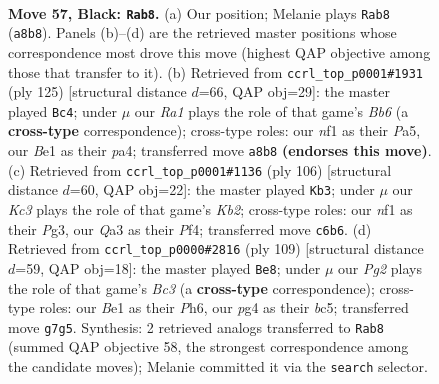 \documentclass[11pt]{article}
\begin{document}
\clearpage

\begin{figure}[p]\centering
\begin{subfigure}{0.46\textwidth}\centering
\resizebox{\linewidth}{!}{%
\newchessgame
\chessboard[
  setfen={r5r1/p5pQ/2k4p/3p3P/p2P2P1/q3P3/7K/4bN2 b - - 23 57},
  showmover=false,
  pgfstyle=straightmove, color=movearrow, markmove={a8-b8}
]}
\caption{}
\end{subfigure}\hfill
\begin{subfigure}{0.46\textwidth}\centering
\resizebox{\linewidth}{!}{%
\newchessgame
\chessboard[
  setfen={8/kr3p2/2Q1p1p1/p2pP3/P4P2/1b2P1K1/8/8 b - - 0 63},
  showmover=false,
  pgfstyle=straightmove, color=movearrow, markmove={b3-c4}
]}
\caption{}
\end{subfigure}
\\[4pt]
\begin{subfigure}{0.46\textwidth}\centering
\resizebox{\linewidth}{!}{%
\newchessgame
\chessboard[
  setfen={8/p4p1k/6p1/q1P4p/5P2/P1R1R1P1/1KP1p3/8 w - - 16 54},
  showmover=false,
  pgfstyle=straightmove, color=movearrow, markmove={b2-b3}
]}
\caption{}
\end{subfigure}\hfill
\begin{subfigure}{0.46\textwidth}\centering
\resizebox{\linewidth}{!}{%
\newchessgame
\chessboard[
  setfen={2rr4/6pk/Q1bP1p1p/2B1pP1P/6P1/6K1/1P6/8 b - - 8 55},
  showmover=false,
  pgfstyle=straightmove, color=movearrow, markmove={c6-e8}
]}
\caption{}
\end{subfigure}
\caption{\textbf{Move 57, Black: \texttt{Rab8}.} (a) Our position; Melanie plays \texttt{Rab8} (\texttt{a8b8}). Panels (b)--(d) are the retrieved master positions whose correspondence most drove this move (highest QAP objective among those that transfer to it). (b) Retrieved from \texttt{ccrl\_top\_p0001\#1931} (ply 125) [structural distance $d$=66, QAP obj=29]: the master played \texttt{Bc4}; under $\mu$ our \emph{Ra1} plays the role of that game's \emph{Bb6} (a \textbf{cross-type} correspondence); cross-type roles: our \emph{n}f1 as their \emph{P}a5, our \emph{B}e1 as their \emph{p}a4; transferred move \texttt{a8b8} \textbf{(endorses this move)}. (c) Retrieved from \texttt{ccrl\_top\_p0001\#1136} (ply 106) [structural distance $d$=60, QAP obj=22]: the master played \texttt{Kb3}; under $\mu$ our \emph{Kc3} plays the role of that game's \emph{Kb2}; cross-type roles: our \emph{n}f1 as their \emph{P}g3, our \emph{Q}a3 as their \emph{P}f4; transferred move \texttt{c6b6}. (d) Retrieved from \texttt{ccrl\_top\_p0000\#2816} (ply 109) [structural distance $d$=59, QAP obj=18]: the master played \texttt{Be8}; under $\mu$ our \emph{Pg2} plays the role of that game's \emph{Bc3} (a \textbf{cross-type} correspondence); cross-type roles: our \emph{B}e1 as their \emph{P}h6, our \emph{p}g4 as their \emph{b}c5; transferred move \texttt{g7g5}. Synthesis: 2 retrieved analogs transferred to \texttt{Rab8} (summed QAP objective 58, the strongest correspondence among the candidate moves); Melanie committed it via the \texttt{search} selector.}
\label{fig:thought-m113}
\end{figure}
\end{document}
